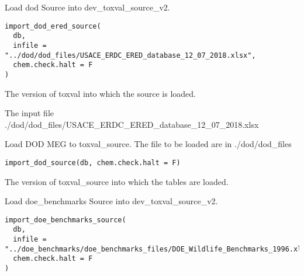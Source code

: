 \documentclass[letterpaper]{book}
\begin{document}
%
\begin{Description}\relax
Load dod Source into dev\_toxval\_source\_v2.
\end{Description}
%
\begin{Usage}
\begin{verbatim}
import_dod_ered_source(
  db,
  infile = "../dod/dod_files/USACE_ERDC_ERED_database_12_07_2018.xlsx",
  chem.check.halt = F
)
\end{verbatim}
\end{Usage}
%
\begin{Arguments}
\begin{ldescription}
\item[\code{db}] The version of toxval into which the source is loaded.

\item[\code{infile}] The input file ./dod/dod\_files/USACE\_ERDC\_ERED\_database\_12\_07\_2018.xlsx
\end{ldescription}
\end{Arguments}
%
\begin{Description}\relax
Load DOD MEG to toxval\_source. The file to be loaded are in ./dod/dod\_files
\end{Description}
%
\begin{Usage}
\begin{verbatim}
import_dod_source(db, chem.check.halt = F)
\end{verbatim}
\end{Usage}
%
\begin{Arguments}
\begin{ldescription}
\item[\code{db}] The version of toxval\_source into which the tables are loaded.
\end{ldescription}
\end{Arguments}
%
\begin{Description}\relax
Load doe\_benchmarks Source into dev\_toxval\_source\_v2.
\end{Description}
%
\begin{Usage}
\begin{verbatim}
import_doe_benchmarks_source(
  db,
  infile = "../doe_benchmarks/doe_benchmarks_files/DOE_Wildlife_Benchmarks_1996.xlsx",
  chem.check.halt = F
)
\end{verbatim}
\end{Usage}
\end{document}
